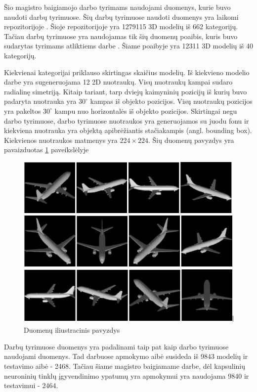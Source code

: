 Šio magistro baigiamojo darbo tyrimams naudojami duomenys, kurie buvo naudoti darbų \cite{cnnExp1, cnnExp2} tyrimuose. Šių darbų tyrimuose naudoti duomenys yra laikomi repozitorijoje \cite{dataRepo}. Šioje repozitorijoje yra 1279115 3D modelių iš 662 kategorijų. Tačiau darbų \cite{cnnExp1, cnnExp2} tyrimuose yra naudojamas tik šių duomenų poaibis, kuris buvo sudarytas tyrimams atliktiems darbe \cite{dbnExp}. Šiame poaibyje yra 12311 3D modelių iš 40 kategorijų.

Kiekvienai kategorijai priklauso skirtingas skaičius modelių. Iš kiekvieno modelio darbe \cite{cnnExp2} yra sugeneruojama 12 2D nuotraukų. Visų nuotraukų kampai sudaro radialinę simetriją. Kitaip tariant, tarp dviejų kaimyninių pozicijų iš kurių buvo padaryta nuotrauka yra $30^{\circ}$ kampas iš objekto pozicijos. Visų nuotraukų pozicijos yra pakeltos $30^{\circ}$ kampu nuo horizontalės iš objekto pozicijos. Skirtingai negu darbo \cite{dbnExp} tyrimuose, darbo \cite{cnnExp2} tyrimuose nuotraukos yra generuojamos su juodu fonu ir kiekviena nuotrauka yra objektą apibrėžiantis stačiakampis (angl. bounding box). Kiekvienos nuotraukos matmenys yra $224\times224$. Šių duomenų pavyzdys yra pavaizduotas \ref{img:data_example} paveikslėlyje


\begin{figure}[H]
	\centering
	\includegraphics[scale=0.5]{img/data_example.png}
	\caption{Duomenų iliustracinis pavyzdys}
	\label{img:data_example}
\end{figure}

Darbų \cite{cnnExp1, cnnExp2} tyrimuose duomenys yra padalinami taip pat kaip darbo \cite{dbnExp} tyrimuose naudojami duomenys. Tad darbuose \cite{cnnExp1, cnnExp2, dbnExp} apmokymo aibė susideda iš 9843 modelių ir testavimo aibė - 2468. Tačiau šiame magistro baigiamame darbe, dėl kapsulinių neuroninių tinklų įgyvendinimo ypatumų yra apmokymui yra naudojama 9840 ir testavimui - 2464.

